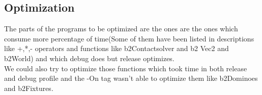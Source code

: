\documentclass[11pt]{article}
\begin{document}
\subsection{Optimization}
The parts of the programs to be optimized are the ones  are the ones which consume more percentage of time(Some of them have been listed in descriptions like +,*,- operators and functions like b2Contactsolver and b2 Vec2 and b2World) and which debug does but release optimizes. \\
We could also try to optimize those functions which took time in both release and debug profile and the -On tag wasn't able to optimize them
like b2Dominoes and b2Fixtures.
\end{document}
